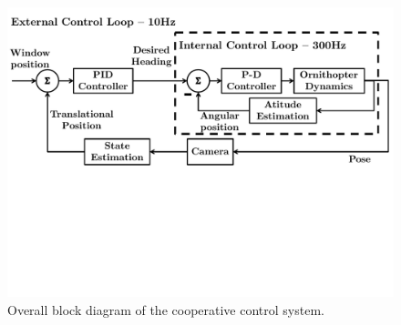 \documentclass{aamas2013}
\begin{document}
\begin{figure}[tb]
\centering
\includegraphics[width=\linewidth]{figures/block_diagrams.pdf}
\caption{Overall block diagram of the cooperative control system.}
\label{fig:block_diagram}
\end{figure}
\end{document}
